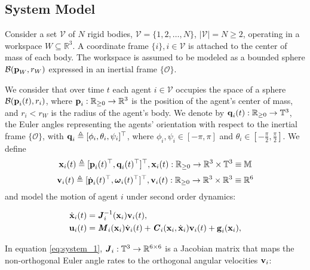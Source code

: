 \subsection{System Model}

Consider a set $\mathcal{V}$ of $N$ rigid bodies,
$\mathcal{V} = \{ 1,2, \ldots, N\}$, $|\mathcal{V}| = N \geq 2$, operating in
a workspace $W\subseteq \mathbb{R}^3$. A coordinate frame
$\{i\}, i\in\mathcal{V}$ is attached to the center of mass of each body.
The workspace is assumed to be modeled as a
bounded sphere $\mathcal{B}(\bm{\mathbf{p}}_W,r_W)$ expressed in an inertial frame
$\{\mathcal{O}\}$.

We consider that over time $t$ each agent $i \in \mathcal{V}$ occupies the
space of a sphere $\mathcal{B}(\bm{\mathbf{p}}_i(t), r_i)$, where
$\bm{\mathbf{p}}_i : \mathbb{R}_{\geq 0} \to \mathbb{R}^3$
is the position of the agent's center of mass, and $r_i < r_W$ is the radius of the
agent's body. We denote by $\bm{\mathbf{q}}_i(t):\mathbb{R}_{\geq 0} \to \mathbb{T}^3$,
the Euler angles representing the agents' orientation with respect to the
inertial frame $\{\mathcal{O}\}$,
with $\bm{\mathbf{q}}_i \triangleq [\phi_i,\theta_i,\psi_i]^{\top}$, where
$\phi_i, \psi_i \in [-\pi, \pi]$ and
$\theta_i \in [-\frac{\pi}{2}, \frac{\pi}{2}]$. We define
$$\bm{\mathbf{x}}_i (t)\triangleq [\bm{\mathbf{p}}_i(t)^{\top},\bm{\mathbf{q}}_i(t)^{\top}]^{\top},
\bm{\mathbf{x}}_i(t):\mathbb{R}_{\geq 0} \to \mathbb{R}^3\times \mathbb{T}^3 \equiv \mathbb{M}$$
$$\bm{\mathbf{v}}_i(t) \triangleq [\dot{\bm{\mathbf{p}}}_i(t)^{\top}, \bm{\mathbf{\omega}}_i(t)^{\top}]^{\top},
\bm{\mathbf{v}}_i(t) : \mathbb{R}_{\geq 0} \to \mathbb{R}^3\times \mathbb{R}^3 \equiv \mathbb{R}^6$$
and model the motion of agent $i$ under second order dynamics:

\begin{subequations}
	\begin{align}
    \dot{\bm{\mathbf{x}}}_i(t) &= \bm{\mathit{J}}_i^{-1}(\bm{\mathbf{x}}_i) \bm{\mathbf{v}}_i(t), \label{eq:system_1} \\
    \bm{\mathbf{u}}_i(t) &= \bm{\mathit{M}}_i(\bm{\mathbf{x}}_i) \dot{\bm{\mathbf{v}}}_i(t) +
      \bm{\mathit{C}}_i(\bm{\mathbf{x}}_i,\dot{\bm{\mathbf{x}}}_i) \bm{\mathbf{v}}_i(t)+\bm{\mathbf{g}}_i(\bm{\mathbf{x}}_i), \label{eq:system_2}
	\end{align}
  \label{eq:system}
\end{subequations}

In equation \eqref{eq:system_1}, $\bm{\mathit{J}}_i:\mathbb{T}^3 \to \mathbb{R}^{6\times6}$ is
a Jacobian matrix that maps the non-orthogonal Euler angle rates to the
orthogonal angular velocities $\bm{\mathbf{v}}_i$:

